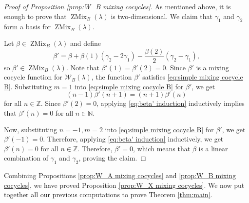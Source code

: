 \documentclass[11pt, svgnames]{amsart}
\newcommand{\ZZ}{\mathbb{Z}}
\newcommand{\NN}{\mathbb{N}}
\newcommand{\W}{\mathcal{W}}
\DeclareMathOperator{\ZMix}{ZMix}
\theoremstyle{definition}
\begin{document}
\begin{proof}[Proof of Proposition \ref{prop:W_B mixing cocycles}]
    As mentioned above, it is enough to prove that $\ZMix_B(\lambda)$ is two-dimensional. We claim that $\gamma_1$ and $\gamma_2$ form a basis for $\ZMix_B(\lambda)$.
    
    Let $\beta \in \ZMix_B(\lambda)$ and define
    $$\beta' = \beta + \beta(1)(\gamma_2 - 2\gamma_1) - \frac{\beta(2)}{2}(\gamma_2 - \gamma_1),$$
    so $\beta' \in \ZMix_B(\lambda)$. Note that $\beta'(1) = \beta'(2) = 0$. Since $\beta'$ is a mixing cocycle function for $\W_B(\lambda)$, the function $\beta'$ satisfies \eqref{eq:simple mixing cocycle B}. Substituting $m = 1$ into \eqref{eq:simple mixing cocycle B} for $\beta'$, we get
    \begin{equation}\label{eq:beta' induction}
        (n - 1)\beta'(n + 1) = (n + 1)\beta'(n)
    \end{equation}
    for all $n \in \ZZ$. Since $\beta'(2) = 0$, applying \eqref{eq:beta' induction} inductively implies that $\beta'(n) = 0$ for all $n \in \NN$.
    
    Now, substituting $n = -1, m = 2$ into \eqref{eq:simple mixing cocycle B} for $\beta'$, we get $\beta'(-1) = 0$. Therefore, applying \eqref{eq:beta' induction} inductively, we get $\beta'(n) = 0$ for all $n \in \ZZ$. Therefore, $\beta' = 0$, which means that $\beta$ is a linear combination of $\gamma_1$ and $\gamma_2$, proving the claim.
\end{proof}

Combining Propositions \ref{prop:W_A mixing cocycles} and \ref{prop:W_B mixing cocycles}, we have proved Proposition \ref{prop:W_X mixing cocycles}. We now put together all our previous computations to prove Theorem \ref{thm:main}.
\end{document}
